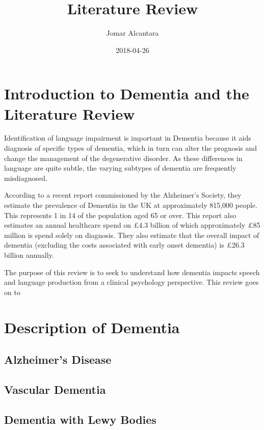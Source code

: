 \documentclass[a4paper]{article}
\title{Literature Review}
\date{2018-04-26}
\author{Jomar Alcantara}
\begin{document}
\maketitle
\newpage
\tableofcontents
\newpage

\section{Introduction to Dementia and the Literature Review}
\par
Identification of language impairment is important in Dementia because it aids diagnosis of specific types of dementia, which in turn can alter the prognosis and change the management of the degenerative disorder. As these differences in language are quite subtle, the varying subtypes of dementia are frequently misdiagnosed.
\newline
\par
According to a recent report commissioned by the Alzheimer's Society, they estimate the prevalence of Dementia in the UK at approximately 815,000 people. This represents 1 in 14 of the population aged 65 or over. This report also estimates an annual healthcare spend on £4.3 billion of which approximately £85 million is spend solely on diagnosis. They also estimate that the overall impact of dementia (excluding the costs associated with early onset dementia) is £26.3 billion annually.
\newline
\par
The purpose of this review is to seek to understand how dementia impacts speech and language production from a clinical psychology perspective. This review goes on to 


\section{Description of Dementia}

\subsection{Alzheimer's Disease}
\subsection{Vascular Dementia}
\subsection{Dementia with Lewy Bodies}
\end{document}
